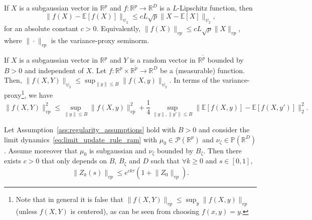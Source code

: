 \documentclass[10pt,a4paper]{amsart}
\newcommand{\E}{\mathbb{E}}
\newcommand{\R}{\mathbb{R}}
\renewcommand{\P}{\mathbb{P}}
\begin{document}
\begin{lemma}\label{lem:subgaussian_via_lipschitz}
    If $X$ is a subgaussian vector in $\R^p$ and $f:\R^p\to \R^D$ is a $L$-Lipschitz function, then
    \[\|f(X)-\E[f(X)]\|_{\psi_2} \leq cL\sqrt{p}\|X - \E[X]\|_{\psi_2}, \]
    for an absolute constant $c>0$. Equivalently, \(\|f(X)\|_{vp} \leq cL\sqrt{p}\|X\|_{vp}\), where $\|\cdot\|_{vp}$ is the variance-proxy seminorm.
\end{lemma}

\begin{lemma}\label{lem:subgaussian_and_bounded_independent}
    If $X$ is a subgaussian vector in $\R^p$ and $Y$ is a random vector in $\R^{\tilde{p}}$ bounded by $B>0$ and independent of $X$. Let $f:\R^p\times\R^{\tilde{p}}\to \R^D$ be a (measurable) function. Then,
    \(\|f(X, Y)\|_{\psi_2} \leq \sup_{\|y\|\leq B}\|f(X,y)\|_{\psi_2}\). In terms of the variance-proxy\footnote{{Note that in general it is false that $\|f(X,Y)\|_{vp} \leq \sup_y \|f(X,y)\|_{vp}$ (unless $f(X,Y)$ is centered), as can be seen from choosing $f(x,y) = y$.}}, we have \[\|f(X, Y)\|_{vp}^2 \leq \sup_{\|y\|\leq B}\|f(X,y)\|_{vp}^2 + \frac{1}{4}\sup_{\|y\|, \|y'\|\leq B}\|\E[f(X,y)]-\E[f(X,y')]\|_{2}^2.\]
\end{lemma}

\begin{lemma}\label{lem:propagation_of_subgaussianity}
Let Assumption~\ref{ass:regularity_assumptions} hold with $B > 0$ and consider the limit dynamics~\eqref{eq:limit_update_rule_ram} with $\mu_0 \in \mathcal{P}(\R^p)$ and $\nu_\zeta \in \P(\R^D)$. Assume moreover that $\mu_0$ is subgaussian {and $\nu_\zeta$ bounded by $B_\zeta$}. Then there exists $c > 0$ that only depends on $B$, $B_\zeta$ and $D$ such that $\forall k \geq 0$ and $s \in [0,1]$,
\[
    \|Z_k(s)\|_{vp} \le e^{ck\tau}({1+} \|Z_0\|_{vp}).
\]
\end{lemma}
\end{document}
